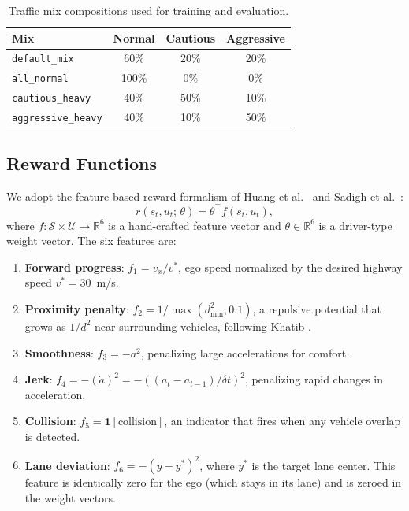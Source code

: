 \documentclass[conference]{IEEEtran}
\begin{document}
\begin{table}[t]
  \caption{Traffic mix compositions used for training and evaluation.}
  \label{tab:mixes}
  \centering
  \begin{tabular}{lccc}
    \toprule
    Mix & Normal & Cautious & Aggressive \\
    \midrule
    \texttt{default\_mix}      & 60\% & 20\% & 20\% \\
    \texttt{all\_normal}       & 100\% & 0\%  & 0\%  \\
    \texttt{cautious\_heavy}   & 40\% & 50\% & 10\% \\
    \texttt{aggressive\_heavy} & 40\% & 10\% & 50\% \\
    \bottomrule
  \end{tabular}
\end{table}

\subsection{Reward Functions}

We adopt the feature-based reward formalism of Huang et al.\ \cite{huang2021personalized}
and Sadigh et al.\ \cite{sadigh2016planning}:
\begin{equation}
  r(s_t, u_t;\, \theta) = \theta^\top f(s_t, u_t),
  \label{eq:reward}
\end{equation}
where $f: \mathcal{S} \times \mathcal{U} \to \mathbb{R}^6$ is a hand-crafted
feature vector and $\theta \in \mathbb{R}^6$ is a driver-type weight vector.
The six features are:
\begin{enumerate}
  \item \textbf{Forward progress}: $f_1 = v_x / v^*$, ego speed normalized
        by the desired highway speed $v^* = 30$~m/s.
  \item \textbf{Proximity penalty}: $f_2 = 1 / \max(d_{\min}^2, 0.1)$, a
        repulsive potential that grows as $1/d^2$ near surrounding vehicles,
        following Khatib \cite{khatib1986realtime}.
  \item \textbf{Smoothness}: $f_3 = -a^2$, penalizing large accelerations
        for comfort \cite{bae2020toward}.
  \item \textbf{Jerk}: $f_4 = -(\dot{a})^2 = -((a_t - a_{t-1})/\delta t)^2$,
        penalizing rapid changes in acceleration.
  \item \textbf{Collision}: $f_5 = \mathbf{1}[\text{collision}]$, an indicator
        that fires when any vehicle overlap is detected.
  \item \textbf{Lane deviation}: $f_6 = -(y - y^*)^2$, where $y^*$ is the
        target lane center. This feature is identically zero for the ego
        (which stays in its lane) and is zeroed in the weight vectors.
\end{enumerate}
\end{document}
